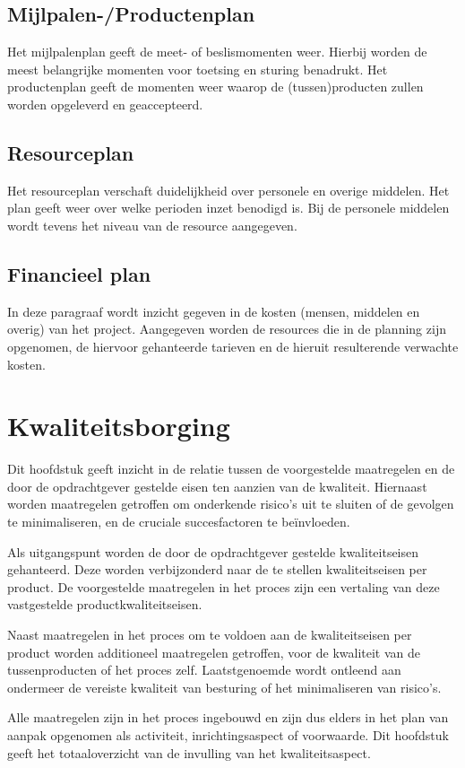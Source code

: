 \documentclass{article}
\begin{document}
\subsection{Mijlpalen-/Productenplan}
Het mijlpalenplan geeft de meet- of beslismomenten weer.
Hierbij worden de meest belangrijke momenten voor toetsing en sturing benadrukt.
Het productenplan geeft de momenten weer waarop de (tussen)producten zullen worden opgeleverd en geaccepteerd.

\subsection{Resourceplan}
Het resourceplan verschaft duidelijkheid over personele en overige middelen.
Het plan geeft weer over welke perioden inzet benodigd is. Bij de personele middelen wordt tevens het niveau van de resource aangegeven.

\subsection{Financieel plan}
In deze paragraaf wordt inzicht gegeven in de kosten (mensen, middelen en overig) van het project.
Aangegeven worden de resources die in de planning zijn opgenomen,
de hiervoor gehanteerde tarieven en de hieruit resulterende verwachte kosten.


\section{Kwaliteitsborging}
Dit hoofdstuk geeft inzicht in de relatie tussen de voorgestelde maatregelen
en de door de opdrachtgever gestelde eisen ten aanzien van de kwaliteit.
Hiernaast worden maatregelen getroffen om onderkende risico's uit te sluiten of de gevolgen te minimaliseren,
en de cruciale succesfactoren te be\"invloeden.

Als uitgangspunt worden de door de opdrachtgever gestelde kwaliteitseisen gehanteerd.
Deze worden verbijzonderd naar de te stellen kwaliteitseisen per product.
De voorgestelde maatregelen in het proces zijn een vertaling van deze vastgestelde productkwaliteitseisen.

Naast maatregelen in het proces om te voldoen aan de kwaliteitseisen per product worden additioneel maatregelen getroffen,
voor de kwaliteit van de tussenproducten of het proces zelf.
Laatstgenoemde wordt ontleend aan ondermeer de vereiste kwaliteit van besturing of het minimaliseren van risico's.

Alle maatregelen zijn in het proces ingebouwd en zijn dus elders in het plan van aanpak opgenomen als activiteit,
inrichtingsaspect of voorwaarde. Dit hoofdstuk geeft het totaaloverzicht van de invulling van het kwaliteitsaspect.
\end{document}
